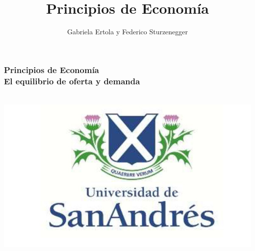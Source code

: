 \documentclass{beamer}
\title[Principios de Economía]{Principios de Economía}
\date{}
\author[Ertola y Sturzenegger]{Gabriela Ertola y Federico Sturzenegger }
\institute[]{Universidad de San Andrés \\
2022}
\begin{document}
\begin{frame}
\frametitle{Principios de Economía
\centering
\\ \vspace{12mm} El equilibrio de oferta y demanda}
\centering
 \\ \vspace{12mm} %
\includegraphics[scale=0.25]{Figures/logoUDESA.jpg} 
\end{frame}
\end{document}
